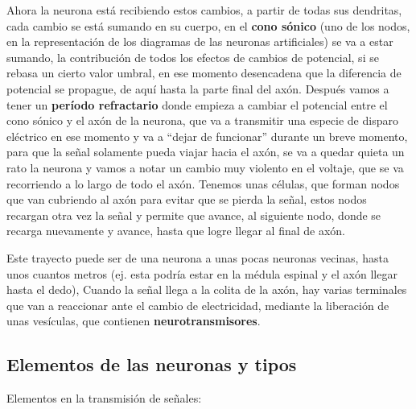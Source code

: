 Ahora la neurona está recibiendo estos cambios, a partir de todas sus dendritas, cada cambio se está sumando en su cuerpo, en el \textbf{cono sónico} (uno de los nodos, en la representación de los diagramas de las neuronas artificiales) se va a estar sumando, la contribución de todos los efectos de cambios de potencial, si se rebasa un cierto valor umbral, en ese momento desencadena que la diferencia de potencial se propague, de aquí hasta la parte final del axón. Después vamos a tener un \textbf{período refractario} donde empieza a cambiar el potencial entre el cono sónico y el axón de la neurona, que va a transmitir una especie de disparo eléctrico en ese momento y va a “dejar de funcionar” durante un breve momento, para que la señal solamente pueda viajar hacia el axón, se va a quedar quieta un rato la neurona y vamos a notar un cambio muy violento en el voltaje, que se va recorriendo a lo largo de todo el axón. Tenemos unas células, que forman nodos que van cubriendo al axón para evitar que se pierda la señal, estos nodos recargan otra vez la señal y permite que avance, al siguiente nodo, donde se recarga  nuevamente y avance, hasta que logre llegar al final de axón.

Este trayecto puede ser de una neurona a unas pocas neuronas vecinas, hasta unos cuantos metros (ej. esta podría estar en la médula espinal y el axón llegar hasta el dedo), Cuando la señal llega a la colita de la axón, hay varias terminales que van a reaccionar ante el cambio de electricidad, mediante la liberación de unas vesículas, que contienen \textbf{neurotransmisores}.


\subsection{Elementos de las neuronas y tipos}

Elementos en la transmisión de señales:

